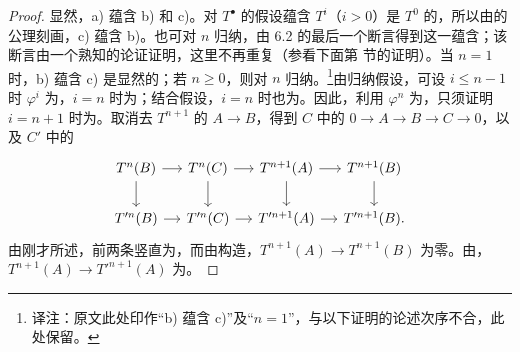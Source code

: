 \begin{proof}
显然，a) 蕴含 b) 和 c)。对 $T^\bullet$ 的假设蕴含 $T^i$（$i>0$）是 $T^0$ 的，所以由的公理刻画，c) 蕴含 b)。也可对 $n$ 归纳，由 6.2 的最后一个断言得到这一蕴含；该断言由一个熟知的论证证明，这里不再重复（参看下面第  节的证明）。当 $n=1$ 时，b) 蕴含 c) 是显然的；若 $n\geq0$，则对 $n$ 归纳。\footnote{译注：原文此处印作“b) 蕴含 c)”及“$n=1$”，与以下证明的论述次序不合，此处保留。}由归纳假设，可设 $i\leq n-1$ 时 $\varphi^i$ 为，$i=n$ 时为；结合假设，$i=n$ 时也为。因此，利用 $\varphi^n$ 为，只须证明 $i=n+1$ 时为。取消去 $T^{n+1}$ 的 $A\to B$，得到 $C$ 中的 $0\to A\to B\to C\to0$，以及 $C'$ 中的
\[
\begin{tikzcd}[column sep=small]
T^n(B)\arrow[r]\arrow[d]&T^n(C)\arrow[r]\arrow[d]&T^{n+1}(A)\arrow[r]\arrow[d]&T^{n+1}(B)\arrow[d]\\
T'^n(B)\arrow[r]&T'^n(C)\arrow[r]&T'^{n+1}(A)\arrow[r]&T'^{n+1}(B).
\end{tikzcd}
\]
由刚才所述，前两条竖直为，而由构造，$T^{n+1}(A)\to T^{n+1}(B)$ 为零。由，$T^{n+1}(A)\to T'^{n+1}(A)$ 为。
\end{proof}

